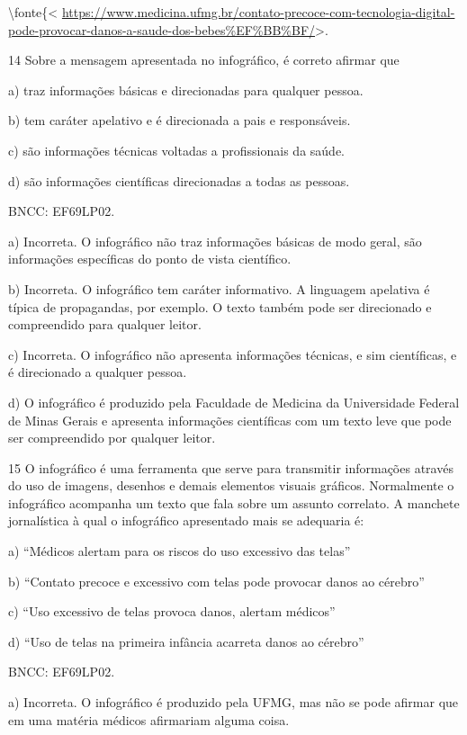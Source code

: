 {\textbackslash fonte\{\textless{}
\url{https://www.medicina.ufmg.br/contato-precoce-com-tecnologia-digital-pode-provocar-danos-a-saude-dos-bebes\%EF\%BB\%BF/}\textgreater.

\num{14} Sobre a mensagem apresentada no infográfico, é correto afirmar
que

a) traz informações básicas e direcionadas para qualquer pessoa.

b) tem caráter apelativo e é direcionada a pais e responsáveis.

c) são informações técnicas voltadas a profissionais da saúde.

d) são informações científicas direcionadas a todas as pessoas.

BNCC: EF69LP02.

a) Incorreta. O infográfico não traz informações básicas de modo geral,
são informações específicas do ponto de vista científico.

b) Incorreta. O infográfico tem caráter informativo. A linguagem
apelativa é típica de propagandas, por exemplo. O texto também pode ser
direcionado e compreendido para qualquer leitor.

c) Incorreta. O infográfico não apresenta informações técnicas, e sim
científicas, e é direcionado a qualquer pessoa.

d) O infográfico é produzido pela Faculdade de Medicina da Universidade
Federal de Minas Gerais e apresenta informações científicas com um texto
leve que pode ser compreendido por qualquer leitor.

\num{15} O infográfico é uma ferramenta que serve para transmitir
informações através do uso de imagens, desenhos e demais elementos
visuais gráficos. Normalmente o infográfico acompanha um texto que fala
sobre um assunto correlato. A manchete jornalística à qual o infográfico
apresentado mais se adequaria é:

a) ``Médicos alertam para os riscos do uso excessivo das telas''

b) ``Contato precoce e excessivo com telas pode provocar danos ao
cérebro﻿''

c) ``Uso excessivo de telas provoca danos, alertam médicos''

d) ``Uso de telas na primeira infância acarreta danos ao cérebro''

BNCC: EF69LP02.

a) Incorreta. O infográfico é produzido pela UFMG, mas não se pode
afirmar que em uma matéria médicos afirmariam alguma coisa.

}
